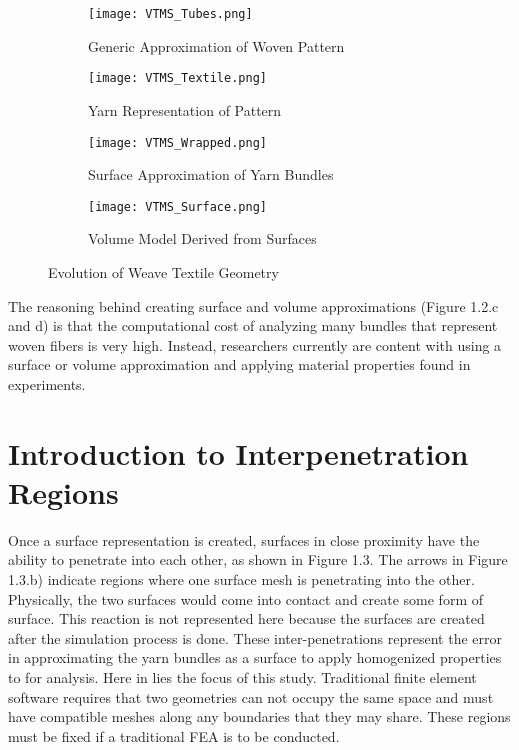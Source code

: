 \begin{figure}
\centering
\begin{subfigure}{.45\textwidth}
  \centering
  \texttt{[image: VTMS\_Tubes.png]}
  \caption{Generic Approximation of Woven Pattern}
\end{subfigure}
\begin{subfigure}{.45\textwidth}
  \centering
  \texttt{[image: VTMS\_Textile.png]}
  \caption{Yarn Representation of Pattern}
\end{subfigure}

\begin{subfigure}{.45\textwidth}
  \centering
  \texttt{[image: VTMS\_Wrapped.png]}
  \caption{Surface Approximation of Yarn Bundles}
\end{subfigure}
\begin{subfigure}{.45\textwidth}
  \centering
  \texttt{[image: VTMS\_Surface.png]}
  \caption{Volume Model Derived from Surfaces}
\end{subfigure}
\caption{Evolution of Weave Textile Geometry}
\end{figure}

The reasoning behind creating surface and volume approximations (Figure 1.2.c and d) is that the computational cost of analyzing many bundles that represent woven fibers is very high. Instead, researchers currently are content with using a surface or volume approximation and applying material properties found in experiments.

\section{Introduction to Interpenetration Regions}

Once a surface representation is created, surfaces in close proximity have the ability to penetrate into each other, as shown in Figure 1.3. The arrows in Figure 1.3.b) indicate regions where one surface mesh is penetrating into the other. Physically, the two surfaces would come into contact and create some form of surface. This reaction is not represented here because the surfaces are created after the simulation process is done. These inter-penetrations represent the error in approximating the yarn bundles as a surface to apply homogenized properties to for analysis. Here in lies the focus of this study. Traditional finite element software requires that two geometries can not occupy the same space and must have compatible meshes along any boundaries that they may share. These regions must be fixed if a traditional FEA is to be conducted.

